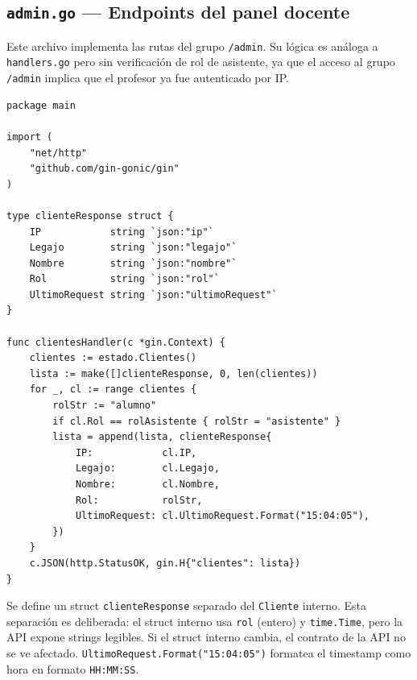 \documentclass[12pt, a4paper]{article}
\begin{document}
\subsection{\texttt{admin.go} — Endpoints del panel docente}

Este archivo implementa las rutas del grupo \texttt{/admin}. Su lógica es análoga a
\texttt{handlers.go} pero sin verificación de rol de asistente, ya que el acceso al
grupo \texttt{/admin} implica que el profesor ya fue autenticado por IP.

\begin{lstlisting}[style=golang, caption={\texttt{admin.go} — lista de clientes}]
package main

import (
    "net/http"
    "github.com/gin-gonic/gin"
)

type clienteResponse struct {
    IP            string `json:"ip"`
    Legajo        string `json:"legajo"`
    Nombre        string `json:"nombre"`
    Rol           string `json:"rol"`
    UltimoRequest string `json:"ultimoRequest"`
}

func clientesHandler(c *gin.Context) {
    clientes := estado.Clientes()
    lista := make([]clienteResponse, 0, len(clientes))
    for _, cl := range clientes {
        rolStr := "alumno"
        if cl.Rol == rolAsistente { rolStr = "asistente" }
        lista = append(lista, clienteResponse{
            IP:            cl.IP,
            Legajo:        cl.Legajo,
            Nombre:        cl.Nombre,
            Rol:           rolStr,
            UltimoRequest: cl.UltimoRequest.Format("15:04:05"),
        })
    }
    c.JSON(http.StatusOK, gin.H{"clientes": lista})
}
\end{lstlisting}

Se define un struct \texttt{clienteResponse} separado del \texttt{Cliente} interno.
Esta separación es deliberada: el struct interno usa \texttt{rol} (entero) y
\texttt{time.Time}, pero la API expone strings legibles. Si el struct interno cambia,
el contrato de la API no se ve afectado. \texttt{UltimoRequest.Format("15:04:05")}
formatea el timestamp como hora en formato \texttt{HH:MM:SS}.
\end{document}
